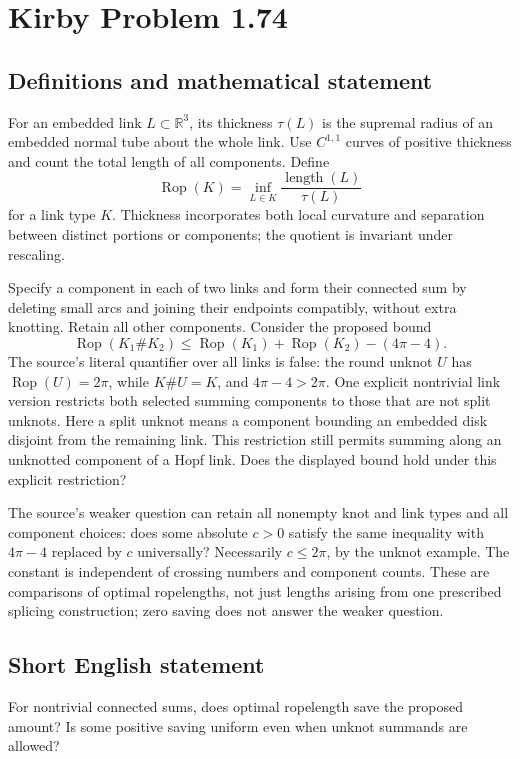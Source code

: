 \documentclass[11pt,a4paper]{article}
\begin{document}
\section*{Kirby Problem 1.74}\label{statement}

\subsection{Definitions and mathematical statement}
For an embedded link $L\subset\mathbb R^3$, its thickness $\tau(L)$ is the supremal radius of an embedded normal tube about the whole link. Use $C^{1,1}$ curves of positive thickness and count the total length of all components. Define
\[
\operatorname{Rop}(K)=\inf_{L\in K}\frac{\operatorname{length}(L)}{\tau(L)}
\]
for a link type $K$. Thickness incorporates both local curvature and separation between distinct portions or components; the quotient is invariant under rescaling.

Specify a component in each of two links and form their connected sum by deleting small arcs and joining their endpoints compatibly, without extra knotting. Retain all other components. Consider the proposed bound
\[
\operatorname{Rop}(K_1\#K_2)\le
\operatorname{Rop}(K_1)+\operatorname{Rop}(K_2)-(4\pi-4).
\]
The source's literal quantifier over all links is false: the round unknot $U$ has $\operatorname{Rop}(U)=2\pi$, while $K\#U=K$, and $4\pi-4>2\pi$.
One explicit nontrivial link version restricts both selected summing components to those that are not split unknots. Here a split unknot means a component bounding an embedded disk disjoint from the remaining link. This restriction still permits summing along an unknotted component of a Hopf link. Does the displayed bound hold under this explicit restriction?

The source's weaker question can retain all nonempty knot and link types and all component choices: does some absolute $c>0$ satisfy the same inequality with $4\pi-4$ replaced by $c$ universally? Necessarily $c\leq2\pi$, by the unknot example. The constant is independent of crossing numbers and component counts. These are comparisons of optimal ropelengths, not just lengths arising from one prescribed splicing construction; zero saving does not answer the weaker question.
\subsection{Short English statement}
For nontrivial connected sums, does optimal ropelength save the proposed amount? Is some positive saving uniform even when unknot summands are allowed?
\end{document}
